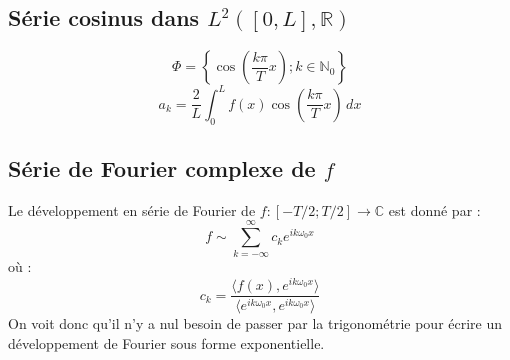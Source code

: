 \documentclass	[11pt, a4paper, openany]{book}
\begin{document}
			\subsection{Série cosinus dans $L^2([0, L], \mathbb{R})$} 
			\begin{equation}
				\Phi = \left\{\cos\left(\frac{k\pi}{T}x\right) ; k \in \mathbb{N}_0\right\}
			\end{equation}
			\begin{equation}
				a_k=\frac{2}{L}\int_0^Lf(x)\cos\left(\frac{k\pi}{T}x\right)\,dx
			\end{equation}
			
			\subsection{Série de Fourier complexe de $f$}
			Le développement en série de Fourier de $f :[-T/2; T/2] \rightarrow \mathbb{C}$ est donné par :
			\begin{equation}
				f \sim \sum_{k=-\infty}^\infty c_ke^{ik\omega_0x}
			\end{equation}
			où :
			\begin{equation}
				c_k = \dfrac{\langle f(x), e^{ik\omega_0x}\rangle}{\langle e^{ik\omega_0x}, e^{ik\omega_0x} \rangle}
			\end{equation}
			On voit donc qu'il n'y a nul besoin de passer par la trigonométrie pour écrire un développement de Fourier sous forme exponentielle.
			
\end{document}
